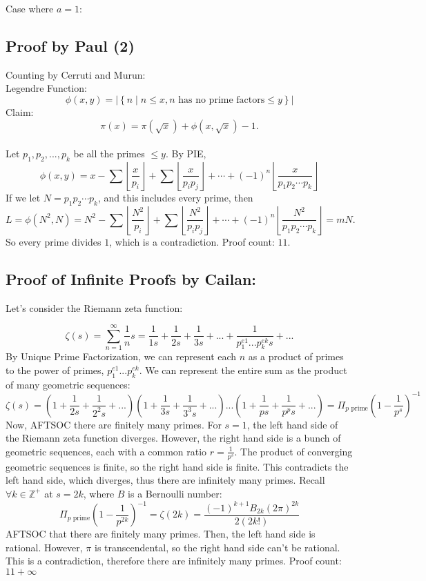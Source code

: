 \documentclass[12pt]{scrartcl}
\begin{document}
Case where $a = 1$:


\subsection*{Proof by Paul (2)}
Counting by Cerruti and Murun:\\
Legendre Function:\\
$$\phi{(x,y)} = \lvert \left\{n \mid n\leq x, n \text{ has no prime factors} \leq y \right\} \rvert $$
Claim:
$$\pi(x)= \pi(\sqrt{x}) + \phi{(x,\sqrt{x})} - 1.$$\\
Let $p_1,p_2,...,p_k$ be all the primes $ \leq y$. By PIE,
$$\phi{(x,y)}=x-\sum{\left\lfloor\frac{x}{p_i}\right\rfloor}+\sum{\left\lfloor\frac{x}{p_ip_j}\right\rfloor}+\cdots+(-1)^n \left\lfloor \frac{x}{p_1p_2\cdots p_k}\right\rfloor$$
If we let $N=p_1p_2\cdots{p_k}$, and this includes every prime, then
$$L=\phi{(N^2,N)}=N^2-\sum{\left\lfloor\frac{N^2}{p_i}\right\rfloor}+\sum{\left\lfloor\frac{N^2}{p_ip_j}\right\rfloor}+\cdots+(-1)^n \left\lfloor \frac{N^2}{p_1p_2\cdots p_k}\right\rfloor=mN.$$
So every prime divides $1$, which is a contradiction. Proof count: $11$.


\subsection*{Proof of Infinite Proofs by Cailan:}
Let's consider the Riemann zeta function:

\begin{equation*}
	\zeta(s) = \sum_{n=1}^\infty \frac{1}{n}s = \frac{1}{1s} + \frac{1}{2s} + \frac{1}{3s} + ... + \frac{1}{p_1^{e1}...p_k^{ek}s} + ...
\end{equation*}
By Unique Prime Factorization, we can represent each $n$ as a product of primes to the power of primes, $p_1^{e1}...p_k^{ek}$. We can represent the entire sum as the product of many geometric sequences:
\begin{equation*}
	\zeta(s) =(1 + {\frac{1}{2s}} + \frac{1}{2^2s}+...)(1 + \frac{1}{3s}+\frac{1}{3^3s}+...)...(1 + \frac{1}{ps}+\frac{1}{p^ps}+...)
	=\Pi_{p\textrm{ prime}}(1-\frac{1}{p^{s}})^{-1}
\end{equation*}
Now, AFTSOC there are finitely many primes. For $s=1$, the left hand side of the Riemann zeta function diverges. However, the right hand side is a bunch of geometric sequences, each with a common ratio $r = \frac{1}{p^s}$. The product of converging geometric sequences is finite, so the right hand side is finite. This contradicts the left hand side, which diverges, thus there are infinitely many primes.
\newline
\newline
Recall $\forall k \in \mathbb{Z}^+$ at $s=2k$, where $B$ is a Bernoulli number:
\begin{equation*}
	\Pi_{p\textrm{ prime}}(1-\frac{1}{p^{2k}})^{-1} = \zeta(2k) = \frac{(-1)^{k+1}B_{2k}(2\pi)^{2k}}{2(2k!)}
\end{equation*}
AFTSOC that there are finitely many primes. Then, the left hand side is rational. However, $\pi$ is transcendental, so the right hand side can't be rational. This is a contradiction, therefore there are infinitely many primes. Proof count: $11+\infty$
\end{document}
